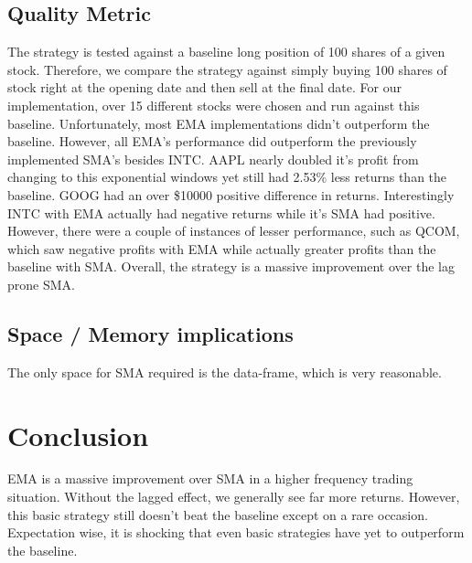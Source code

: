 \documentclass[letterpaper,11pt]{article}
\begin{document}
\subsection*{Quality Metric}
The strategy is tested against a baseline long position of 100 shares of a given stock. Therefore, we compare the strategy against simply buying 100 shares of stock right at the opening date and then sell at the final date. For our implementation, over 15 different stocks were chosen and run against this baseline. Unfortunately, most EMA implementations didn't outperform the baseline. However, all EMA's performance did outperform the previously implemented SMA's besides INTC. AAPL nearly doubled it's profit from changing to this exponential windows yet still had 2.53\% less returns than the baseline. GOOG had an over \$10000 positive difference in returns. Interestingly INTC with EMA actually had negative returns while it's SMA had positive. However, there were a couple of instances of lesser performance, such as QCOM, which saw negative profits with EMA while actually greater profits than the baseline with SMA. Overall, the strategy is a massive improvement over the lag prone SMA.

\subsection*{Space / Memory implications}
The only space for SMA required is the data-frame, which is very reasonable.

\section*{Conclusion}
EMA is a massive improvement over SMA in a higher frequency trading situation. Without the lagged effect, we generally see far more returns. However, this basic strategy still doesn't beat the baseline except on a rare occasion. Expectation wise, it is shocking that even basic strategies have yet to outperform the baseline.
\end{document}
